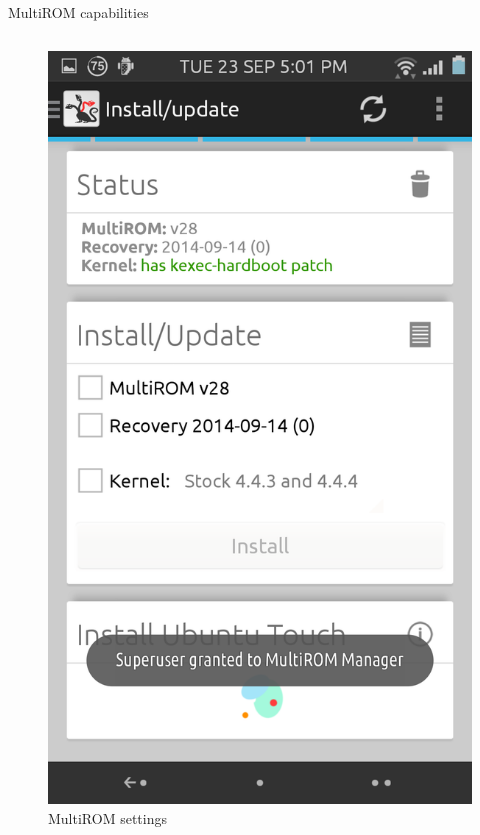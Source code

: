 \documentclass{beamer}
\begin{document}
\begin{frame}{MultiROM capabilities}
\begin{columns}
  \begin{column}{0.5\textwidth}
    \begin{figure}
   \includegraphics[scale=.08]{multirom2}    
   \caption{MultiROM settings}
    \end{figure}

    
  \end{column}
 \end{columns}
 \end{frame}
\end{document}
